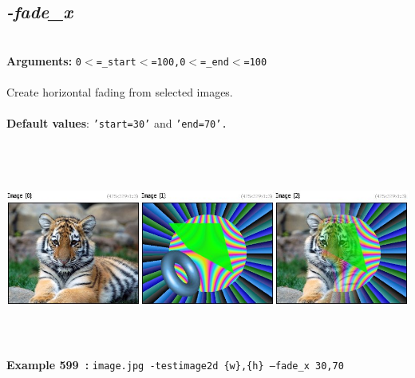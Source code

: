 \documentclass[a4paper,11pt,twoside]{book}
\begin{document}
\subsection{\emph{-fade\_x} }\vspace*{-0.5em}
~\\\textbf{Arguments: } 
{\small \texttt{0$<$=\_start$<$=100,0$<$=\_end$<$=100}}\\~\\
Create horizontal fading from selected images.
~\\~\\\textbf{Default values}: {\small \texttt{'start=30'} and \texttt{'end=70'.}}
\begin{center}\includegraphics[keepaspectratio=true,height=7cm,width=\textwidth]{img/gmic_def599.jpg}\\
{\footnotesize \textbf{Example 599~:} \texttt{image.jpg -testimage2d \{w\},\{h\} --fade\_x 30,70}}
\end{center}
\end{document}
